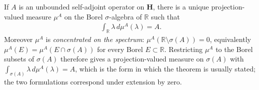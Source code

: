 \begin{theorem}
    \label{thrm:hall-10.4}
    \leanok
    If $A$ is an unbounded self-adjoint operator on $\mathbf{H}$, there is a unique projection-valued measure $\mu^A$ on the Borel $\sigma$-algebra of $\mathbb{R}$ such that
    \begin{align}
        \int_{\mathbb{R}} \lambda \, d\mu^A(\lambda) = A.
    \end{align}
    Moreover $\mu^A$ is \textit{concentrated on the spectrum}: $\mu^A(\mathbb{R}\setminus\sigma(A)) = 0$, equivalently $\mu^A(E) = \mu^A(E \cap \sigma(A))$ for every Borel $E \subset \mathbb{R}$. Restricting $\mu^A$ to the Borel subsets of $\sigma(A)$ therefore gives a projection-valued measure on $\sigma(A)$ with $\int_{\sigma(A)}\lambda\,d\mu^A(\lambda) = A$, which is the form in which the theorem is usually stated; the two formulations correspond under extension by zero.
\end{theorem}
